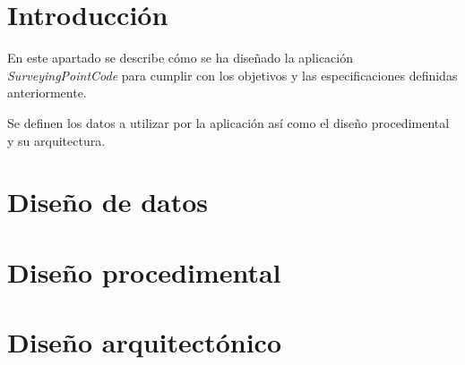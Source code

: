 
\section{Introducción}
En este apartado se describe cómo se ha diseñado la aplicación \emph{SurveyingPointCode} para cumplir con los objetivos y las especificaciones definidas anteriormente.

Se definen los datos a utilizar por la aplicación así como el diseño procedimental y su arquitectura.
\section{Diseño de datos}
\section{Diseño procedimental}

\section{Diseño arquitectónico}


